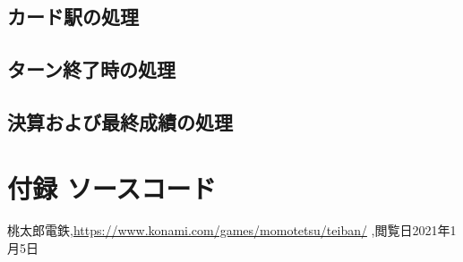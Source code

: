 \documentclass[a4j]{jarticle}
\begin{document}
    \subsection{カード駅の処理}
    \subsection{ターン終了時の処理}
    \subsection{決算および最終成績の処理}
    
    \section{付録 ソースコード}

    \begin{thebibliography}{9}
          桃太郎電鉄,\url{https://www.konami.com/games/momotetsu/teiban/} ,閲覧日2021年1月5日
        \end{thebibliography}
\end{document}
